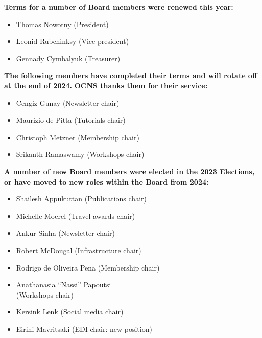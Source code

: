 \documentclass[11pt,a4paper,oneside]{article}
\begin{document}
\textbf{Terms for a number of Board members were renewed this year:}
\begin{multicols}{2}
  \begin{itemize}
    \item Thomas Nowotny (President)
    \item Leonid Rubchinksy (Vice president)
    \item Gennady Cymbalyuk (Treasurer)
  \end{itemize}
\end{multicols}

\textbf{The following members have completed their terms and will rotate off at the end of 2024.}
\textbf{OCNS thanks them for their service:}
\begin{multicols}{2}
  \begin{itemize}
    \item Cengiz Gunay (Newsletter chair)
    \item Maurizio de Pitta (Tutorials chair)
    \item Christoph Metzner (Membership chair)
    \item Srikanth Ramaswamy (Workshops chair)
  \end{itemize}
\end{multicols}

\textbf{A number of new Board members were elected in the 2023 Elections, or have moved to new roles within the Board from 2024:}
\begin{multicols}{2}
  \begin{itemize}
    \item Shailesh Appukuttan (Publications chair)
    \item Michelle Moerel (Travel awards chair)
    \item Ankur Sinha (Newsletter chair)
    \item Robert McDougal (Infrastructure chair)
    \item Rodrigo de Oliveira Pena (Membership chair)
    \item Anathanasia \enquote{Nassi} Papoutsi\\(Workshops chair)
    \item Kersink Lenk (Social media chair)
    \item Eirini Mavritsaki (EDI chair: new position)
  \end{itemize}
\end{multicols}
\end{document}
